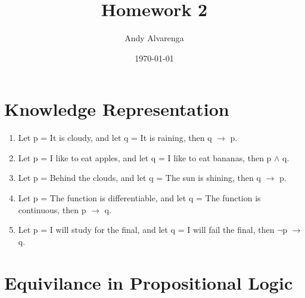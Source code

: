 \documentclass[11pt]{article}
\title{Homework 2}
\author{Andy Alvarenga}
\date{\today}
\begin{document}
\maketitle

\section{Knowledge Representation}

\begin{enumerate}
\item Let p = It is cloudy, and let q = It is raining, then q $\rightarrow$ p.
\item Let p = I like to eat apples, and let q = I like to eat bananas, then p $\wedge$ q.
\item Let p = Behind the clouds, and let q = The sun is shining, then q $\rightarrow$ p.
\item Let p = The function is differentiable, and let q = The function is continuous, then p $\rightarrow$ q.
\item Let p = I will study for the final, and let q = I will fail the final, then $\neg$p $\rightarrow$ q.
\end{enumerate}

\section{Equivilance in Propositional Logic}
\end{document}
